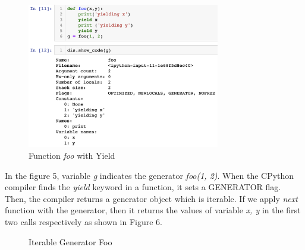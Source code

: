 \begin{figure}[H]
	\centering
	\includegraphics[width=0.75\textwidth]{figures/foo1}
	\caption{Function \textit{foo} with Yield}
\end{figure}

In the figure 5, variable \textit{g} indicates the generator \textit{foo(1, 2)}. When the CPython compiler finds the \textit{yield} keyword in a function, it sets a GENERATOR flag. Then, the compiler returns a generator object which is iterable. If we apply \textit{next} function with the generator, then it returns the values of variable \textit{x, y} in the first two calls respectively as shown in Figure 6.

\begin{figure}[H]
	\centering
	\qquad
	\qquad
	\caption{Iterable Generator Foo}%
	\label{fig:example}%
\end{figure}


